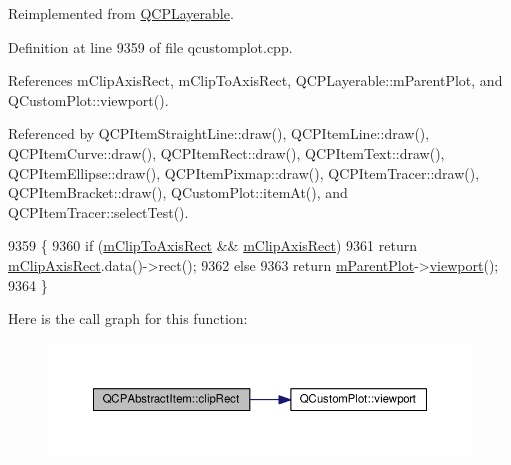 Reimplemented from \hyperlink{class_q_c_p_layerable_a07a8f746640c3704b09910df297afcba}{Q\+C\+P\+Layerable}.



Definition at line 9359 of file qcustomplot.\+cpp.



References m\+Clip\+Axis\+Rect, m\+Clip\+To\+Axis\+Rect, Q\+C\+P\+Layerable\+::m\+Parent\+Plot, and Q\+Custom\+Plot\+::viewport().



Referenced by Q\+C\+P\+Item\+Straight\+Line\+::draw(), Q\+C\+P\+Item\+Line\+::draw(), Q\+C\+P\+Item\+Curve\+::draw(), Q\+C\+P\+Item\+Rect\+::draw(), Q\+C\+P\+Item\+Text\+::draw(), Q\+C\+P\+Item\+Ellipse\+::draw(), Q\+C\+P\+Item\+Pixmap\+::draw(), Q\+C\+P\+Item\+Tracer\+::draw(), Q\+C\+P\+Item\+Bracket\+::draw(), Q\+Custom\+Plot\+::item\+At(), and Q\+C\+P\+Item\+Tracer\+::select\+Test().


\begin{DoxyCode}
9359                                       \{
9360   \textcolor{keywordflow}{if} (\hyperlink{class_q_c_p_abstract_item_ad2a70ff6b658fcb84a9427f69d3f587d}{mClipToAxisRect} && \hyperlink{class_q_c_p_abstract_item_a3e57cfe7da4b1ac3d6fa7281ea437361}{mClipAxisRect})
9361     \textcolor{keywordflow}{return} \hyperlink{class_q_c_p_abstract_item_a3e57cfe7da4b1ac3d6fa7281ea437361}{mClipAxisRect}.data()->rect();
9362   \textcolor{keywordflow}{else}
9363     \textcolor{keywordflow}{return} \hyperlink{class_q_c_p_layerable_aa2a528433e44db02b8aef23c1f9f90ed}{mParentPlot}->\hyperlink{class_q_custom_plot_a953ecdbc28018e7e84cb6213ad3d88c2}{viewport}();
9364 \}
\end{DoxyCode}


Here is the call graph for this function\+:\nopagebreak
\begin{figure}[H]
\begin{center}
\leavevmode
\includegraphics[width=350pt]{class_q_c_p_abstract_item_a538e25ff8856534582f5b2b400a46405_cgraph}
\end{center}
\end{figure}




